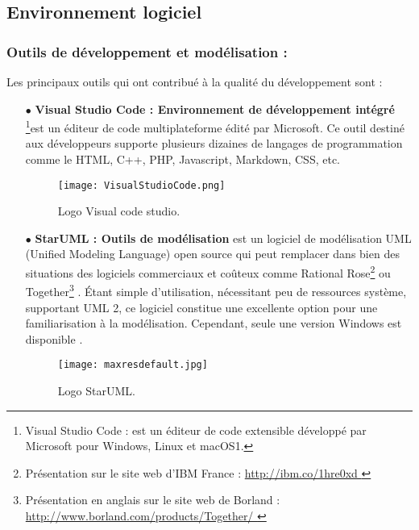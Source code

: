 \subsection{Environnement logiciel}

\subsubsection{Outils de développement et modélisation :}
Les principaux outils qui ont contribué à la qualité du développement sont :

\begin{itemize}
	\item[$\bullet$] \textbf{Visual Studio Code : Environnement de développement intégré } \footnote{Visual Studio Code : est un éditeur de code extensible développé par Microsoft pour Windows, Linux et macOS1.}est un éditeur de code multiplateforme édité par Microsoft. Ce outil destiné aux développeurs supporte plusieurs dizaines de langages de programmation comme le HTML, C++, PHP, Javascript, Markdown, CSS, etc. \cite{wiki:Visual_Studio_Code}
\begin{figure}[ht]
	\centering
	\texttt{[image: VisualStudioCode.png]}
	\caption{Logo Visual code studio.}
	\label{fig:VisualStudioCode }
\end{figure}
\FloatBarrier

\medskip

\item[$\bullet$] \textbf{StarUML : Outils de modélisation} 
est un logiciel de modélisation UML (Unified Modeling Language) open source qui peut remplacer dans bien des situations des logiciels commerciaux et coûteux comme Rational Rose\footnote{Présentation sur le site web d’IBM France :
\url{http://ibm.co/1hre0xd } } ou Together\footnote{Présentation en anglais sur le site web de Borland : \url{http://www.borland.com/products/Together/ }}
. Étant simple d’utilisation, nécessitant peu de
ressources système, supportant UML 2, ce logiciel constitue une excellente option pour une familiarisation à la modélisation. Cependant, seule une version Windows est disponible . \cite{wiki:StarUML} 
	\begin{figure}[ht]
		\centering
		\texttt{[image: maxresdefault.jpg]}
		\caption{Logo StarUML.}
		\label{fig:StarUML }
	\end{figure}
	\FloatBarrier
    \medskip



\end{itemize}
